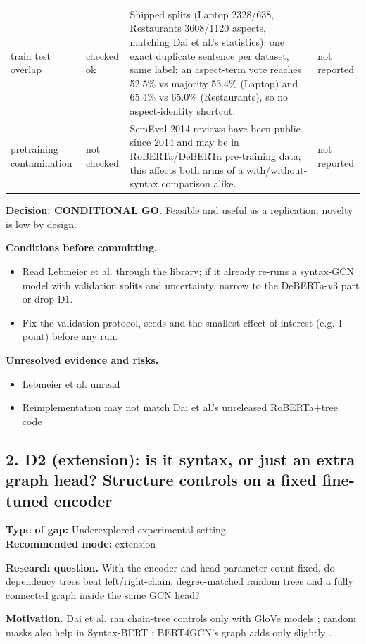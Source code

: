 \documentclass[11pt,a4paper]{article}
\begin{document}
{\begin{longtable}{>{\raggedright\arraybackslash}p{}>{\raggedright\arraybackslash}p{}>{\raggedright\arraybackslash}p{}>{\raggedright\arraybackslash}p{}}
train test overlap & checked ok & [V] Shipped splits (Laptop 2328/638, Restaurants 3608/1120 aspects, matching Dai et al.'s statistics): one exact duplicate sentence per dataset, same label; an aspect-term vote reaches 52.5\% vs majority 53.4\% (Laptop) and 65.4\% vs 65.0\% (Restaurants), so no aspect-identity shortcut. \cite{dai2021syntax} & not reported \\
pretraining contamination & not checked & SemEval-2014 reviews have been public since 2014 and may be in RoBERTa/DeBERTa pre-training data; this affects both arms of a with/without-syntax comparison alike. & not reported \\
\bottomrule
\end{longtable}
}

\textbf{Decision: CONDITIONAL GO.} Feasible and useful as a replication; novelty is low by design.

\textbf{Conditions before committing.}
\begin{itemize}
\item Read Lebmeier et al. through the library; if it already re-runs a syntax-GCN model with validation splits and uncertainty, narrow to the DeBERTa-v3 part or drop D1.
\item Fix the validation protocol, seeds and the smallest effect of interest (e.g. 1 point) before any run.
\end{itemize}

\textbf{Unresolved evidence and risks.}
\begin{itemize}
\item Lebmeier et al. unread
\item Reimplementation may not match Dai et al.'s unreleased RoBERTa+tree code
\end{itemize}

\subsection{2. D2 (extension): is it syntax, or just an extra graph head? Structure controls on a fixed fine-tuned encoder}
\textbf{Type of gap:} Underexplored experimental setting\\
\textbf{Recommended mode:} extension

\textbf{Research question.} With the encoder and head parameter count fixed, do dependency trees beat left/right-chain, degree-matched random trees and a fully connected graph inside the same GCN head?

\textbf{Motivation.} Dai et al. ran chain-tree controls only with GloVe models \cite{dai2021syntax}; random masks also help in Syntax-BERT \cite{bai2021syntaxbert}; BERT4GCN's graph adds only slightly \cite{xiao2021bert4gcn}.
\end{document}
